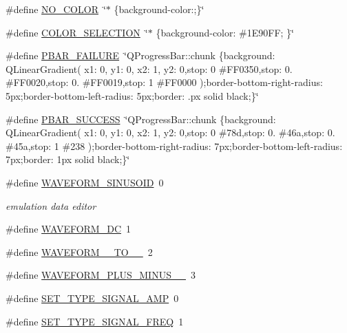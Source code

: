 \begin{DoxyCompactItemize}
\item 
\#define \hyperlink{a00034_a69d859e537f858ca285d77a66755ded6}{N\+O\+\_\+\+C\+O\+L\+O\+R}~\char`\"{}$\ast$ \{background-\/color\+:;\}\char`\"{}
\item 
\#define \hyperlink{a00034_ab32e4b2a4ecbb271c28640764ed4824c}{C\+O\+L\+O\+R\+\_\+\+S\+E\+L\+E\+C\+T\+I\+O\+N}~\char`\"{}$\ast$ \{background-\/color\+: \#1\+E90\+F\+F; \}\char`\"{}
\item 
\#define \hyperlink{a00034_aa9f43b2774395af6510910f8feed7cb4}{P\+B\+A\+R\+\_\+\+F\+A\+I\+L\+U\+R\+E}~\char`\"{}Q\+Progress\+Bar\+::chunk \{background\+: Q\+Linear\+Gradient( x1\+: 0, y1\+: 0, x2\+: 1, y2\+: 0,stop\+: 0 \#F\+F0350,stop\+: 0. \#F\+F0020,stop\+: 0. \#F\+F0019,stop\+: 1 \#F\+F0000 );border-\/bottom-\/right-\/radius\+: 5px;border-\/bottom-\/left-\/radius\+: 5px;border\+: .\+px solid black;\}\char`\"{}
\item 
\#define \hyperlink{a00034_a1ff3389746e26aa43aed6c6b7c9997bd}{P\+B\+A\+R\+\_\+\+S\+U\+C\+C\+E\+S\+S}~\char`\"{}Q\+Progress\+Bar\+::chunk \{background\+: Q\+Linear\+Gradient( x1\+: 0, y1\+: 0, x2\+: 1, y2\+: 0,stop\+: 0 \#78d,stop\+: 0. \#46a,stop\+: 0. \#45a,stop\+: 1 \#238 );border-\/bottom-\/right-\/radius\+: 7px;border-\/bottom-\/left-\/radius\+: 7px;border\+: 1px solid black;\}\char`\"{}
\item 
\#define \hyperlink{a00034_aab68961c5134b28289cb1311cac7d500}{W\+A\+V\+E\+F\+O\+R\+M\+\_\+\+S\+I\+N\+U\+S\+O\+I\+D}~0
\begin{DoxyCompactList}\small\item\em emulation data editor \end{DoxyCompactList}\item 
\#define \hyperlink{a00034_a0997727a7675c2520283e5c2b2018d7d}{W\+A\+V\+E\+F\+O\+R\+M\+\_\+\+D\+C}~1
\item 
\#define \hyperlink{a00034_ae18fed2471b16a8516d721ff60671dd9}{W\+A\+V\+E\+F\+O\+R\+M\+\_\+\_\+\+T\+O\+\_\+\_}~2
\item 
\#define \hyperlink{a00034_a0923d3b365a36e1e8c401cec964aa36f}{W\+A\+V\+E\+F\+O\+R\+M\+\_\+\+P\+L\+U\+S\+\_\+\+M\+I\+N\+U\+S\+\_\+\_}~3
\item 
\#define \hyperlink{a00034_a32500d8cf5fb09339cc8f97d52206b41}{S\+E\+T\+\_\+\+T\+Y\+P\+E\+\_\+\+S\+I\+G\+N\+A\+L\+\_\+\+A\+M\+P}~0
\item 
\#define \hyperlink{a00034_ac1c2065e42f20c51064c84c0db23e9f5}{S\+E\+T\+\_\+\+T\+Y\+P\+E\+\_\+\+S\+I\+G\+N\+A\+L\+\_\+\+F\+R\+E\+Q}~1
\item 

\end{DoxyCompactItemize}
